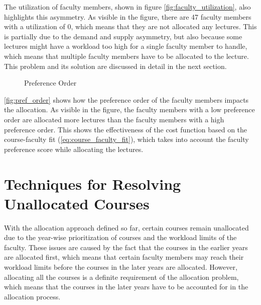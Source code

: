 The utilization of faculty members, shown in figure \autoref{fig:faculty_utilization}, also highlights this asymmetry. As visible in the figure, there are 47 faculty members with a utilization of 0, which means that they are not allocated any lectures. This is partially due to the demand and supply asymmetry, but also because some lectures might have a workload too high for a single faculty member to handle, which means that multiple faculty members have to be allocated to the lecture. This problem and its solution are discussed in detail in the next section.

\begin{figure}[H]
  \centering
  \caption{Preference Order}
  \label{fig:pref_order}
\end{figure}

\autoref{fig:pref_order} shows how the preference order of the faculty members impacts the allocation. As visible in the figure, the faculty members with a low preference order are allocated more lectures than the faculty members with a high preference order. This shows the effectiveness of the cost function based on the course-faculty fit (\autoref{eq:course_faculty_fit}), which takes into account the faculty preference score while allocating the lectures.

\section{Techniques for Resolving Unallocated Courses}
\label{sec:rectifying_unallocated_courses}

With the allocation approach defined so far, certain courses remain unallocated due to the year-wise prioritization of courses and the workload limits of the faculty. These issues are caused by the fact that the courses in the earlier years are allocated first, which means that certain faculty members may reach their workload limits before the courses in the later years are allocated. However, allocating all the courses is a definite requirement of the allocation problem, which means that the courses in the later years have to be accounted for in the allocation process.

